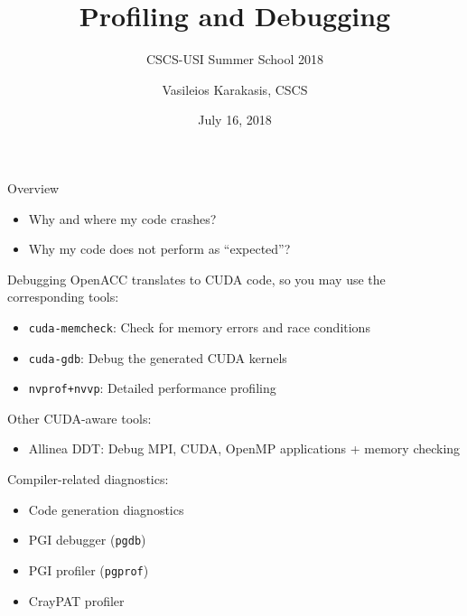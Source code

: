 \documentclass[aspectratio=169,12pt]{beamer}
\author{Vasileios Karakasis, CSCS}
\title{Profiling and Debugging}
\subtitle{CSCS-USI Summer School 2018}
\date{July 16, 2018}
\begin{document}
\cscstitle

\begin{frame}{Overview}
  \large
  \begin{itemize}
  \item Why and where my code crashes?
    \vspace\baselineskip
  \item Why my code does not perform as ``expected''?
  \end{itemize}
\end{frame}

\begin{frame}{Debugging}
  OpenACC translates to CUDA code, so you may use the corresponding tools:
  \begin{itemize}
  \item \texttt{cuda-memcheck}: Check for memory errors and race conditions
  \item \texttt{cuda-gdb}: Debug the generated CUDA kernels
  \item \texttt{nvprof+nvvp}: Detailed performance profiling
  \end{itemize}

  Other CUDA-aware tools:
  \begin{itemize}
  \item Allinea DDT: Debug MPI, CUDA, OpenMP applications + memory checking
  \end{itemize}

  Compiler-related diagnostics:
  \begin{itemize}
  \item Code generation diagnostics
  \item PGI debugger (\texttt{pgdb})
  \item PGI profiler (\texttt{pgprof})
  \item CrayPAT profiler
  \end{itemize}

\end{frame}
\end{document}
